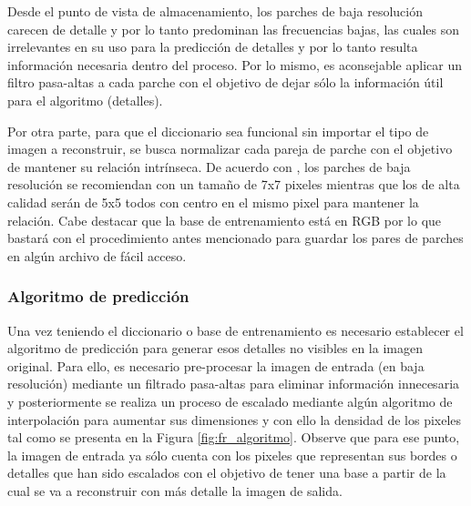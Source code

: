 Desde el punto de vista de almacenamiento, los parches de baja resolución carecen 
de detalle y por lo tanto predominan las frecuencias bajas, las cuales son 
irrelevantes en su uso para la predicción de detalles y por lo tanto resulta
información necesaria dentro del proceso. Por lo mismo, es aconsejable aplicar un filtro pasa-altas a cada parche 
con el objetivo de dejar sólo la información útil para el algoritmo (detalles).

Por otra parte, para que el diccionario sea funcional sin importar el 
tipo de imagen a reconstruir, se busca normalizar cada pareja de parche con el 
objetivo de mantener su relación intrínseca. De acuerdo con \cite{freeman}, 
los parches de baja resolución se recomiendan con un tamaño de 7x7 pixeles
mientras que los de alta calidad serán de 5x5 todos con centro en el mismo pixel
para mantener la relación. Cabe destacar que la base de entrenamiento está en 
RGB por lo que bastará con el procedimiento antes mencionado para guardar
los pares de parches en algún archivo de fácil acceso. 

\subsubsection{Algoritmo de predicción}
\noindent
Una vez teniendo el diccionario o base de entrenamiento es necesario establecer el algoritmo de 
predicción para generar esos detalles no visibles en la imagen original.
Para ello, es necesario pre-procesar la imagen de entrada (en baja resolución)
mediante un filtrado pasa-altas para eliminar información innecesaria y posteriormente se realiza
un proceso de escalado mediante algún algoritmo de interpolación para
aumentar sus dimensiones y con ello la densidad de los pixeles tal como se presenta
en la Figura \ref{fig:fr_algoritmo}. Observe que para ese punto, la imagen de entrada
ya sólo cuenta con los pixeles que representan sus bordes o detalles que han sido
escalados con el objetivo de tener una base a partir de la cual se va a reconstruir
con más detalle la imagen de salida. 